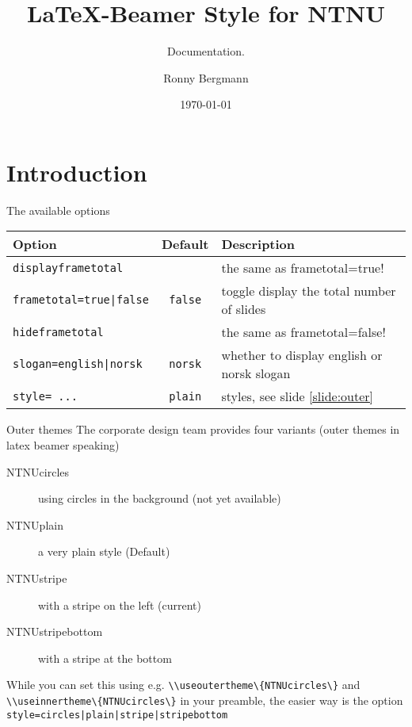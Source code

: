 \documentclass[aspectratio=169]{beamer}
\title{\LaTeX{}-Beamer Style for NTNU}
\subtitle{Documentation.}
\author{Ronny Bergmann}
\date{\today}
\begin{document}
	\maketitle
	\tableofcontents

	\section{Introduction}
	\begin{frame}[fragile]{The available options}
		\begin{tabular}{lcl}
			\toprule
			\textbf{Option} & \textbf{Default} &\textbf{Description} \\
			\midrule
			\lstinline!displayframetotal! && the same as \lstinline!!frametotal=true! \\
			\lstinline!frametotal=true|false! & \lstinline!false! & toggle display the total number of slides\\
			\lstinline!hideframetotal! && the same as \lstinline!!frametotal=false! \\
			\lstinline!slogan=english|norsk! & \lstinline!norsk! & whether to display english or norsk slogan\\
			\lstinline!style= ...! & \lstinline!plain! & styles, see slide \ref{slide:outer}\\
			\bottomrule
		\end{tabular}
	\end{frame}
	\begin{frame}{Outer themes}
		\label{slide:outer}
		The corporate design team provides four variants (outer themes in latex beamer speaking)

		\begin{description}
			\item[NTNUcircles] using circles in the background (not yet available)
			\item[NTNUplain] a very plain style (Default)
			\item[NTNUstripe] with a stripe on the left (current)
			\item[NTNUstripebottom] with a stripe at the bottom
		\end{description}

		While you can set this using e.g. \lstinline!\\useoutertheme\{NTNUcircles\}! and \lstinline!\\useinnertheme\{NTNUcircles\}!
		in your preamble, the easier way is the option
        \lstinline!style=circles|plain|stripe|stripebottom!
	\end{frame}
\end{document}
